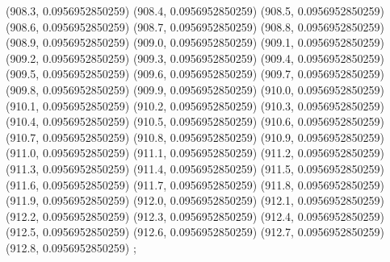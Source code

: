 {					(908.3, 0.0956952850259)
					(908.4, 0.0956952850259)
					(908.5, 0.0956952850259)
					(908.6, 0.0956952850259)
					(908.7, 0.0956952850259)
					(908.8, 0.0956952850259)
					(908.9, 0.0956952850259)
					(909.0, 0.0956952850259)
					(909.1, 0.0956952850259)
					(909.2, 0.0956952850259)
					(909.3, 0.0956952850259)
					(909.4, 0.0956952850259)
					(909.5, 0.0956952850259)
					(909.6, 0.0956952850259)
					(909.7, 0.0956952850259)
					(909.8, 0.0956952850259)
					(909.9, 0.0956952850259)
					(910.0, 0.0956952850259)
					(910.1, 0.0956952850259)
					(910.2, 0.0956952850259)
					(910.3, 0.0956952850259)
					(910.4, 0.0956952850259)
					(910.5, 0.0956952850259)
					(910.6, 0.0956952850259)
					(910.7, 0.0956952850259)
					(910.8, 0.0956952850259)
					(910.9, 0.0956952850259)
					(911.0, 0.0956952850259)
					(911.1, 0.0956952850259)
					(911.2, 0.0956952850259)
					(911.3, 0.0956952850259)
					(911.4, 0.0956952850259)
					(911.5, 0.0956952850259)
					(911.6, 0.0956952850259)
					(911.7, 0.0956952850259)
					(911.8, 0.0956952850259)
					(911.9, 0.0956952850259)
					(912.0, 0.0956952850259)
					(912.1, 0.0956952850259)
					(912.2, 0.0956952850259)
					(912.3, 0.0956952850259)
					(912.4, 0.0956952850259)
					(912.5, 0.0956952850259)
					(912.6, 0.0956952850259)
					(912.7, 0.0956952850259)
					(912.8, 0.0956952850259)
				};
